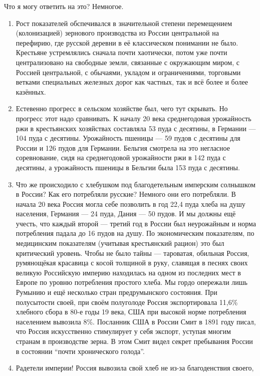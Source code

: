 \noindent Что я могу ответить на это? Немногое.

\begin{enumerate}
\item Рост показателей обспечивался в значительной степени перемещением
(колонизацией) зернового производства из России центральной на перефирию, где
русской деревни в её классическом понимании не было. Крестьяне устремлялись
сначала почти хаотически, потом уже почти централизовано на свободные земли,
связанные с окружающим миром, с Россией центральной, с обычаями, укладом и
ограничениями, торговыми ветками специальных железных дорог как частных, так и
всё более и более казённых.
\item Естевенно прогресс в сельском хозяйстве был, чего тут скрывать. Но
прогресс этот надо сравнивать. К началу 20 века среднегодовая урожайность ржи в
крестьянских хозяйствах составляла 53 пуда с десятины, в Германии --- 104 пуда с
десятины. Урожайность пшеницы --- 59 пудов с десятины для России и 126 пудов для
Германии. Бельгия смотрела на это негласное соревнование, сидя на среднегодовой
урожайности ржи в 142 пуда с десятины, а урожайность пшеницы в Бельгии была 153
пуда с десятины.
\item Что же происходило с хлебушком под благодетельным имперским солнышком в
России? Как его потребляли русские? Немного они его потребляли. В начала 20 века
Россия могла себе позволить в год 22,4 пуда хлеба на душу населения, Германия
--- 24 пуда, Дания --- 50 пудов. И мы должны ещё учесть, что каждый второй ---
третий год в России был неурожайным и норма потребления падала до 16 пудов на
душу. По экономическим показателям, по медицинским показателям (учитывая
крестьянский рацион) это был критический уровень. Чтобы не было тайны ---
тароватая, обильная Россия, румянощёкая красавица с косой толщиной в руку,
славящая в песнях своих великую Российскую империю находилась на одном из
последних мест в Европе по уровню потребления простого хлеба. Мы гордо опережали
лишь Румынию и ещё несколько стран предрумынского состояния. При полусытости
своей, при своём полуголоде Россия экспортировала 11,6\% хлебного сбора в 80-е
годы 19 века, США при высокой норме потребления населением вывозила 8\%.
Посланник США в России Смит в 1891 году писал, что Россия искусственно
стимулирует у себя экспорт, уступая многим странам в производстве зерна. В этом
Смит видел секрет пребывания России в состоянии \enquote{почти хронического
голода}.
\item Радетели империи! Россия вывозила свой хлеб не из-за благоденствия своего,

\end{enumerate}
